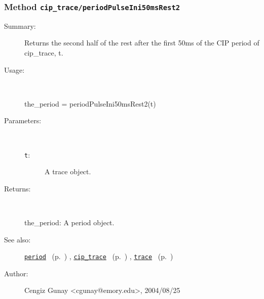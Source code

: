 \subsubsection[Method \texttt{periodPulseIni50msRest2}]{Method \texttt{cip\_trace/periodPulseIni50msRest2}}%
%
\label{ref_cip_trace__periodPulseIni50msRest2}%
\hypertarget{ref_cip_trace__periodPulseIni50msRest2}{}%
\begin{description}
\item[Summary:]Returns the second half of the rest after the 
			first 50ms of the CIP period of cip\_trace, t. 
%
\item[Usage:]~%
\begin{lyxcode}%
the\_period = periodPulseIni50msRest2(t)
%
\end{lyxcode}%
%
%
\item[Parameters:]~
\begin{description}%
\item[\texttt{t}:]
 A trace object.
\end{description}%
%
\item[Returns:
]~

	the\_period: A period object.
%
%
\item[See also:]%
\hyperlink{ref_period}{\texttt{period}}%
\ (p.~\pageref{ref_period})%
%
, \hyperlink{ref_cip_trace}{\texttt{cip\_trace}}%
\ (p.~\pageref{ref_cip_trace})%
%
, \hyperlink{ref_trace}{\texttt{trace}}%
\ (p.~\pageref{ref_trace})%
%
%
\item[Author:]%
Cengiz Gunay <cgunay@emory.edu>, 2004/08/25
%
\end{description}
\methodline%
